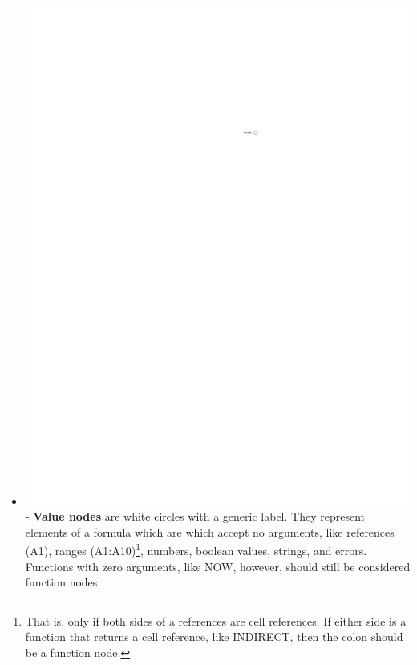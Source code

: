 \documentclass[conference]{IEEEtran}
\begin{document}
\begin{itemize}
		\item \vspace{.25cm}\includegraphics{glossary-leaf} - \textbf{Value nodes} are white circles
		with a generic label. They represent elements of a formula which are which
		accept no arguments, like references (A1), ranges (A1:A10)\footnote{That is,
			only if both sides of a references are cell references. If either side is a
			function that returns a cell reference, like INDIRECT, then the colon should
			be a function node.}, numbers, boolean values, strings, and errors. Functions
		with zero arguments, like NOW, however, should still be considered function
		nodes.
		

\end{itemize}
\end{document}
